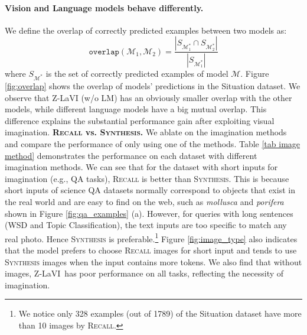 \documentclass[11pt]{article}
\newcommand{\model}{Z-LaVI}
\begin{document}
\paragraph{Vision and Language models behave differently.} 
We define the overlap of correctly predicted examples between two models as: 
\begin{equation}
    \texttt{overlap}(\mathcal{M}_1, \mathcal{M}_2) = \frac{|S_{\mathcal{M}_1^*} \cap S_{\mathcal{M}_2^*}|}{|S_{\mathcal{M}_1^*}|}
\end{equation}
where $S_{\mathcal{M}^*}$ is the set of correctly predicted examples of model $\mathcal{M}$. Figure \ref{fig:overlap} shows the overlap of models' predictions in the Situation dataset. We observe that Z-LaVI (w/o LM) has an obviously smaller overlap with the other models, while different language models have a big mutual overlap. This difference explains the substantial performance gain after exploiting visual imagination.
\medbreak
\noindent \textbf{\textsc{Recall} vs. \textsc{Synthesis}.} We ablate on the imagination methods and compare the performance of only using one of the methods. Table \ref{tab image method} demonstrates the performance on each dataset with different imagination methods. We can see that for the dataset with short inputs for imagination
(e.g., QA tasks), \textsc{Recall} is better than \textsc{Synthesis}. This is because 
short inputs of science QA datasets normally correspond to objects that exist in the real world and are easy to find on the web, such as \textit{mollusca} and \textit{porifera} shown in Figure \ref{fig:qa_examples} (a). However, for queries with long sentences (WSD and Topic Classification), the text inputs are too specific to match any real photo. Hence \textsc{Synthesis} is preferable.\footnote{We notice only 328 examples (out of 1789) of the Situation dataset have more than 10 images by \textsc{Recall}.} Figure \ref{fig:image_type} also indicates that the model prefers to choose \textsc{Recall} images for short input and tends to use \textsc{Synthesis} images when the input contains more tokens. We also find that without images, \model~has poor performance on all tasks, reflecting the necessity of imagination.
\end{document}
